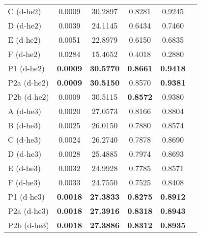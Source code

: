 \documentclass[superscriptaddress,longbibliography,aps,prl,twocolumn,10pt]{revtex4-2}
\begin{document}
\begin{table}[t]
{\begin{tabular}{lccccc}
C (d-he2) \cite{Khan2014, stain_normalisation_toolbox_v2_2, Ruifrok2001} & 0.0009 & 30.2897 & 0.8281 & 0.9245 \\
D (d-he2) \cite{Khan2014, stain_normalisation_toolbox_v2_2, Macenko2009} & 0.0039 & 24.1145 & 0.6434 & 0.7460 \\
E (d-he2) \cite{Khan2014, stain_normalisation_toolbox_v2_2} & 0.0051 & 22.8979 & 0.6150 & 0.6835 \\
F (d-he2) \cite{Alsubaie2017} & 0.0284 & 15.4652 & 0.4018 & 0.2880 \\
P1 (d-he2) & \textbf{0.0009} & \textbf{30.5770} & \textbf{0.8661} & \textbf{0.9418} \\
P2a (d-he2) & \textbf{0.0009} & \textbf{30.5150} & 0.8570 & \textbf{0.9381} \\
P2b (d-he2) & 0.0009 & 30.5115 & \textbf{0.8572} & 0.9380 \\
\hline
A (d-he3) \cite{Ruifrok2001} & 0.0020 & 27.0573 & 0.8166 & 0.8804 \\
B (d-he3) \cite{Ruifrok2001} & 0.0025 & 26.0150 & 0.7880 & 0.8574 \\
C (d-he3) \cite{Khan2014, stain_normalisation_toolbox_v2_2, Ruifrok2001} & 0.0024 & 26.2740 & 0.7878 & 0.8690 \\
D (d-he3) \cite{Khan2014, stain_normalisation_toolbox_v2_2, Macenko2009} & 0.0028 & 25.4885 & 0.7974 & 0.8693 \\
E (d-he3) \cite{Khan2014, stain_normalisation_toolbox_v2_2} & 0.0032 & 24.9928 & 0.7785 & 0.8571 \\
F (d-he3) \cite{Alsubaie2017} & 0.0033 & 24.7550 & 0.7525 & 0.8408 \\
P1 (d-he3) & \textbf{0.0018} & \textbf{27.3833} & \textbf{0.8275} & \textbf{0.8912} \\
P2a (d-he3) & \textbf{0.0018} & \textbf{27.3916} & \textbf{0.8318} & \textbf{0.8943} \\
P2b (d-he3) & \textbf{0.0018} & \textbf{27.3886} & \textbf{0.8312} & \textbf{0.8935} \\
\bottomrule
\end{tabular}}
\label{tab:Hstain_sep_comp}
\end{table}
\end{document}
